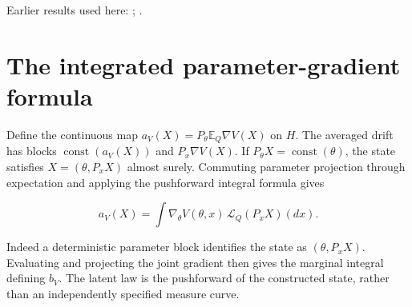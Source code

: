 \documentclass[11pt,a4paper]{article}
\begin{document}
Earlier results used here: \cite[Section~3.1.1]{LangevinLean2026IPLA}; \cite[Section~3.3.1]{LangevinLean2026IPLA}.

\section{\texorpdfstring{The integrated parameter-gradient formula}{The integrated parameter-gradient formula}}


Define the continuous map \(a_V(X)=P_\theta\mathbb E_Q\nabla V(X)\) on \(H\). The averaged drift has blocks \(\operatorname{const}(a_V(X))\) and \(P_x\nabla V(X)\). If \(P_\theta X=\operatorname{const}(\theta)\), the state satisfies \(X=(\theta,P_xX)\) almost surely. Commuting parameter projection through expectation and applying the pushforward integral formula gives

\[a_V(X)=\int\nabla_\theta V(\theta,x)\,\mathcal L_Q(P_xX)(dx).\]

Indeed a deterministic parameter block identifies the state as \((\theta,P_xX)\). Evaluating and projecting the joint gradient then gives the marginal integral defining \(b_V\). The latent law is the pushforward of the constructed state, rather than an independently specified measure curve.
\end{document}
